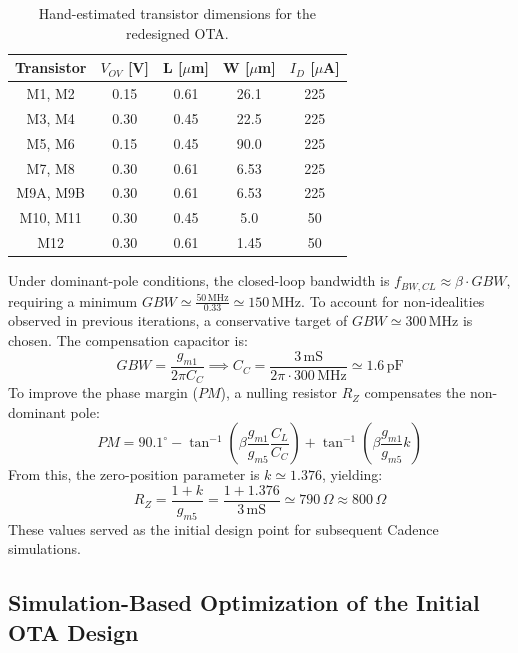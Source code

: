 \begin{table}[H]
\centering
\caption{Hand-estimated transistor dimensions for the redesigned OTA.}
\label{tab:redesign_hand_sizing}
\begin{tabular}{|c|c|c|c|c|}
\hline
\textbf{Transistor} & \textbf{$V_{OV}$ [V]} & \textbf{L [$\mu$m]} & \textbf{W [$\mu$m]} & \textbf{$I_D$ [$\mu$A]} \\ \hline
M1, M2 & 0.15 & 0.61 & 26.1 & 225 \\ \hline
M3, M4 & 0.30 & 0.45 & 22.5 & 225 \\ \hline
M5, M6 & 0.15 & 0.45 & 90.0 & 225 \\ \hline
M7, M8 & 0.30 & 0.61 & 6.53 & 225 \\ \hline
M9A, M9B & 0.30 & 0.61 & 6.53 & 225 \\ \hline
M10, M11 & 0.30 & 0.45 & 5.0 & 50 \\ \hline
M12 & 0.30 & 0.61 & 1.45 & 50 \\ \hline
\end{tabular}
\end{table}

Under dominant-pole conditions, the closed-loop bandwidth is $f_{BW,CL}\approx\beta\cdot GBW$, requiring a minimum $GBW \simeq \frac{50\,\mathrm{MHz}}{0.33} \simeq 150\,\mathrm{MHz}$. To account for non-idealities observed in previous iterations, a conservative target of $GBW\simeq300\,\mathrm{MHz}$ is chosen. The compensation capacitor is:
\begin{equation*}
GBW=\frac{g_{m1}}{2\pi C_C} \implies C_C = \frac{3\,\mathrm{mS}}{2\pi\cdot300\,\mathrm{MHz}} \simeq 1.6\,\mathrm{pF}
\end{equation*}
To improve the phase margin ($PM$), a nulling resistor $R_Z$ compensates the non-dominant pole:
\begin{equation*}
PM = 90.1^\circ - \tan^{-1}\left(\beta\frac{g_{m1}}{g_{m5}}\frac{C_L}{C_C}\right) + \tan^{-1}\left(\beta\frac{g_{m1}}{g_{m5}}k\right)
\end{equation*}
From this, the zero-position parameter is $k\simeq1.376$, yielding:
\begin{equation*}
R_Z = \frac{1+k}{g_{m5}} = \frac{1+1.376}{3\,\mathrm{mS}} \simeq 790\,\Omega \approx 800\,\Omega
\end{equation*}
These values served as the initial design point for subsequent Cadence simulations.

\subsection{Simulation-Based Optimization of the Initial OTA Design}

